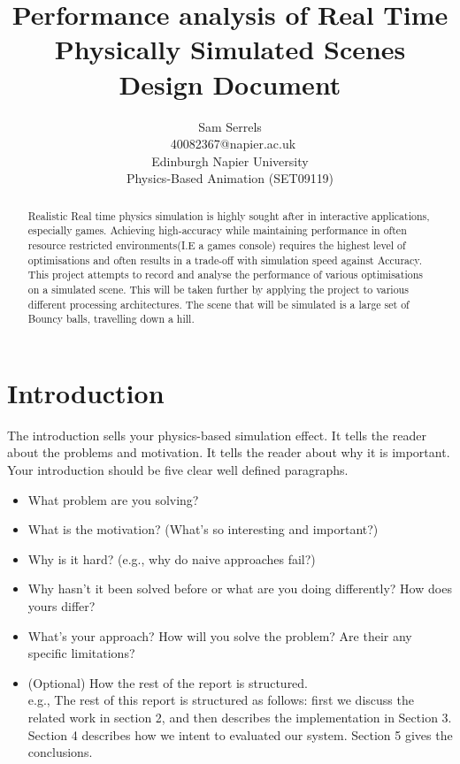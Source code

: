 \documentclass[conference]{acmsiggraph}
\title{Performance analysis of Real Time Physically Simulated Scenes \\
	   Design Document}
\author{Sam Serrels\\\ 40082367@napier.ac.uk \\
Edinburgh Napier University\\
Physics-Based Animation (SET09119)}
\begin{document}

\maketitle

\begin{abstract}
Realistic Real time physics simulation is highly sought after in interactive applications, especially games. Achieving high-accuracy while maintaining performance in often resource restricted environments(I.E a games console) requires the highest level of optimisations and often results in a trade-off with simulation speed against Accuracy. This project attempts to record and analyse the performance of various optimisations on a simulated scene. This will be taken further by applying the project to various different processing architectures. The scene that will be simulated is a large set of Bouncy balls, travelling down a hill.
\end{abstract}

\keywordlist
\copyrightspace

\section{Introduction}

The introduction sells your physics-based simulation effect.  It tells the reader about the problems and motivation.  It tells the reader about why it is important.  Your introduction should be five clear well defined paragraphs.

\begin{itemize}
\item What problem are you solving?
\item What is the motivation? (What's so interesting and important?)
\item Why is it hard? (e.g., why do naive approaches fail?)
\item Why hasn't it been solved before or what are you doing differently? How does yours differ?
\item What's your approach?  How will you solve the problem?  Are their any specific limitations?
\item (Optional) How the rest of the report is structured.\\
e.g., The rest of this report is structured as follows: first we discuss the related work in section 2, and then describes the implementation in Section 3.  Section 4 describes how we intent to evaluated our system.  Section 5 gives the conclusions.
\end{itemize}
\end{document}
